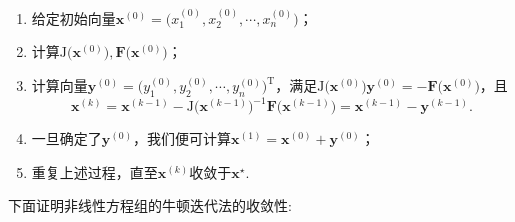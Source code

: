 \documentclass[cn,12pt,founder,a4paper]{elegantpaper}
\newcommand{\transpose}{\mathrm{T}}
\newcommand{\J}{\b{\mathrm{J}}}
\renewcommand{\emph}[1]{{\heiti{#1}}}
\renewcommand{\b}{\boldsymbol}
\begin{document}
\begin{enumerate}
  \item[\emph{步一}]
  给定初始向量\(\b{x}^{(0)}=\big(x_1^{(0)},x_2^{(0)},\cdots,x_n^{(0)}\big)\)；
  \item[\emph{步二}]
  计算\(\J\big(\b{x}^{(0)}\big),\b{F}\big(\b{x}^{(0)}\big)\)；
  \item[\emph{步三}]
  计算向量\(\b{y}^{(0)}=\big(y_1^{(0)},y_2^{(0)},\cdots,y_n^{(0)}\big)^\transpose\)，满足\(\J\big(\b{x}^{(0)}\big)\b{y}^{(0)}=-\b{F}\big(\b{x}^{(0)}\big)\)，且
  \[\b{x}^{(k)}=\b{x}^{(k-1)}-\J\big(\b{x}^{(k-1)}\big)^{-1}\b{F}\big(\b{x}^{(k-1)}\big)=\b{x}^{(k-1)}-\b{y}^{(k-1)}.\]
  \item[\emph{步四}]
  一旦确定了\(\b{y}^{(0)}\)，我们便可计算\(\b{x}^{(1)}=\b{x}^{(0)}+\b{y}^{(0)}\)；
  \item[\emph{步五}]  
  重复上述过程，直至\(\b{x}^{(k)}\)收敛于\(\b{x}^\star\).
\end{enumerate}
下面证明非线性方程组的牛顿迭代法的收敛性:
\end{document}
